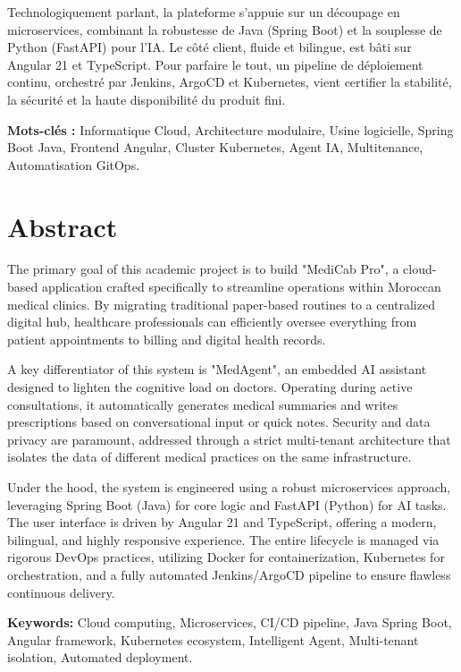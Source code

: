 \documentclass[final]{report}
\begin{document}
Technologiquement parlant, la plateforme s'appuie sur un découpage en microservices, combinant la robustesse de Java (Spring Boot) et la souplesse de Python (FastAPI) pour l'IA. Le côté client, fluide et bilingue, est bâti sur Angular 21 et TypeScript. Pour parfaire le tout, un pipeline de déploiement continu, orchestré par Jenkins, ArgoCD et Kubernetes, vient certifier la stabilité, la sécurité et la haute disponibilité du produit fini.
 
\textbf{Mots-clés :} Informatique Cloud, Architecture modulaire, Usine logicielle, Spring Boot Java, Frontend Angular, Cluster Kubernetes, Agent IA, Multitenance, Automatisation GitOps.
 
\chapter*{Abstract}
 
The primary goal of this academic project is to build "MediCab Pro", a cloud-based application crafted specifically to streamline operations within Moroccan medical clinics. By migrating traditional paper-based routines to a centralized digital hub, healthcare professionals can efficiently oversee everything from patient appointments to billing and digital health records.
 
A key differentiator of this system is "MedAgent", an embedded AI assistant designed to lighten the cognitive load on doctors. Operating during active consultations, it automatically generates medical summaries and writes prescriptions based on conversational input or quick notes. Security and data privacy are paramount, addressed through a strict multi-tenant architecture that isolates the data of different medical practices on the same infrastructure.
 
Under the hood, the system is engineered using a robust microservices approach, leveraging Spring Boot (Java) for core logic and FastAPI (Python) for AI tasks. The user interface is driven by Angular 21 and TypeScript, offering a modern, bilingual, and highly responsive experience. The entire lifecycle is managed via rigorous DevOps practices, utilizing Docker for containerization, Kubernetes for orchestration, and a fully automated Jenkins/ArgoCD pipeline to ensure flawless continuous delivery.
 
\textbf{Keywords:} Cloud computing, Microservices, CI/CD pipeline, Java Spring Boot, Angular framework, Kubernetes ecosystem, Intelligent Agent, Multi-tenant isolation, Automated deployment.
 
\end{document}
